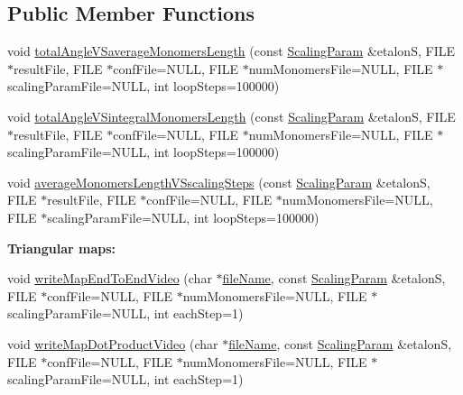 \subsection*{Public Member Functions}
\begin{DoxyCompactItemize}
\item 
void \hyperlink{class_p_c_a_1_1_polymer_scaling_a5e0684790a3295de961dcc7b282c8c1f}{total\+Angle\+V\+Saverage\+Monomers\+Length} (const \hyperlink{class_p_c_a_1_1_polymer_scaling_1_1_scaling_param}{Scaling\+Param} \&etalonS, F\+I\+LE $\ast$result\+File, F\+I\+LE $\ast$conf\+File=N\+U\+LL, F\+I\+LE $\ast$num\+Monomers\+File=N\+U\+LL, F\+I\+LE $\ast$scaling\+Param\+File=N\+U\+LL, int loop\+Steps=100000)
\item 
void \hyperlink{class_p_c_a_1_1_polymer_scaling_a6c1fbca75891e468b75ac482347232df}{total\+Angle\+V\+Sintegral\+Monomers\+Length} (const \hyperlink{class_p_c_a_1_1_polymer_scaling_1_1_scaling_param}{Scaling\+Param} \&etalonS, F\+I\+LE $\ast$result\+File, F\+I\+LE $\ast$conf\+File=N\+U\+LL, F\+I\+LE $\ast$num\+Monomers\+File=N\+U\+LL, F\+I\+LE $\ast$scaling\+Param\+File=N\+U\+LL, int loop\+Steps=100000)
\item 
void \hyperlink{class_p_c_a_1_1_polymer_scaling_a9910d5acf149b15e92a5c4ddaf8dd944}{average\+Monomers\+Length\+V\+Sscaling\+Steps} (const \hyperlink{class_p_c_a_1_1_polymer_scaling_1_1_scaling_param}{Scaling\+Param} \&etalonS, F\+I\+LE $\ast$result\+File, F\+I\+LE $\ast$conf\+File=N\+U\+LL, F\+I\+LE $\ast$num\+Monomers\+File=N\+U\+LL, F\+I\+LE $\ast$scaling\+Param\+File=N\+U\+LL, int loop\+Steps=100000)
\end{DoxyCompactItemize}
\begin{Indent}{\bf Triangular maps\+:}\par
\begin{DoxyCompactItemize}
\item 
void \hyperlink{class_p_c_a_1_1_polymer_scaling_a9ef7952c6b05b0614b81752f82f614a4}{write\+Map\+End\+To\+End\+Video} (char $\ast$\hyperlink{map_end_to_end_movie_8m_acbece2625a541230e9f9091adca38c8c}{file\+Name}, const \hyperlink{class_p_c_a_1_1_polymer_scaling_1_1_scaling_param}{Scaling\+Param} \&etalonS, F\+I\+LE $\ast$conf\+File=N\+U\+LL, F\+I\+LE $\ast$num\+Monomers\+File=N\+U\+LL, F\+I\+LE $\ast$scaling\+Param\+File=N\+U\+LL, int each\+Step=1)
\item 
void \hyperlink{class_p_c_a_1_1_polymer_scaling_aec67d14d95d0482dc7dc08155abb0609}{write\+Map\+Dot\+Product\+Video} (char $\ast$\hyperlink{map_end_to_end_movie_8m_acbece2625a541230e9f9091adca38c8c}{file\+Name}, const \hyperlink{class_p_c_a_1_1_polymer_scaling_1_1_scaling_param}{Scaling\+Param} \&etalonS, F\+I\+LE $\ast$conf\+File=N\+U\+LL, F\+I\+LE $\ast$num\+Monomers\+File=N\+U\+LL, F\+I\+LE $\ast$scaling\+Param\+File=N\+U\+LL, int each\+Step=1)
\end{DoxyCompactItemize}
\end{Indent}
